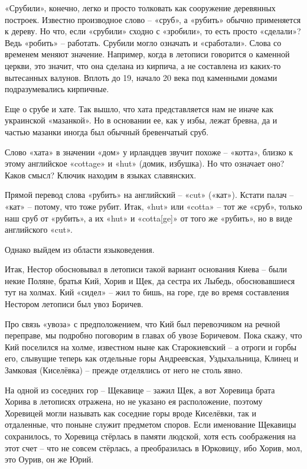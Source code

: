 «Срубили», конечно, легко и просто толковать как сооружение деревянных построек. Известно производное слово – «сруб», а «рубить» обычно применяется к дереву. Но что, если «срубили» сходно с «зробили», то есть просто «сделали»? Ведь «робить» – работать. Срубили могло означать и «сработали». Слова со временем меняют значение. Например, когда в летописи говорится о каменной церкви, это значит, что она сделана из кирпича, а не составлена из каких-то вытесанных валунов. Вплоть до 19, начало 20 века под каменными домами подразумевались кирпичные.

Еще о срубе и хате. Так вышло, что хата представляется нам не иначе как украинской «мазанкой». Но в основании ее, как у избы, лежат бревна, да и частью мазанки иногда был обычный бревенчатый сруб.

Слово «хата» в значении «дом» у ирландцев звучит похоже – «котта», близко к этому английское «cottage» и «hut» (домик, избушка). Но что означает оно? Каков смысл? Ключик находим в языках славянских.

Прямой перевод слова «рубить» на английский – «cut» («кат»). Кстати палач – «кат» – потому, что тоже рубит. Итак, «hut» или «cotta» – тот же «сруб», только наш сруб от «рубить», а их «hut» и «cotta[ge]» от того же «рубить», но в виде английского «cut».

Однако выйдем из области языковедения.

Итак, Нестор обосновывал в летописи такой вариант основания Киева – были некие Поляне, братья Кий, Хорив и Щек, да сестра их Лыбедь, обосновавшиеся тут на холмах. Кий «сидел» – жил то бишь, на горе, где во время составления Нестором летописи был увоз Боричев. 

Про связь «увоза» с предположением, что Кий был перевозчиком на речной переправе, мы подробно поговорим в главах об увозе Боричевом. Пока скажу, что Кий поселился на холме, известном ныне как Старокиевский – а отроги и горбы его, слывущие теперь как отдельные горы Андреевская, Уздыхальница, Клинец и Замковая (Киселёвка) – прежде отделялись от него не столь явно.

На одной из соседних гор – Щекавице – зажил Щек, а вот Хоревица брата Хорива в летописях отражена, но не указано ея расположение, поэтому Хоревицей могли называть как соседние горы вроде Киселёвки, так и отдаленные, что поныне служит предметом споров. Если именование Щекавицы сохранилось, то Хоревица стёрлась в памяти людской, хотя есть соображения на этот счет – что не совсем стёрлась, а преобразилась в Юрковицу, ибо Хорив, мол, это Оурив, он же Юрий.


